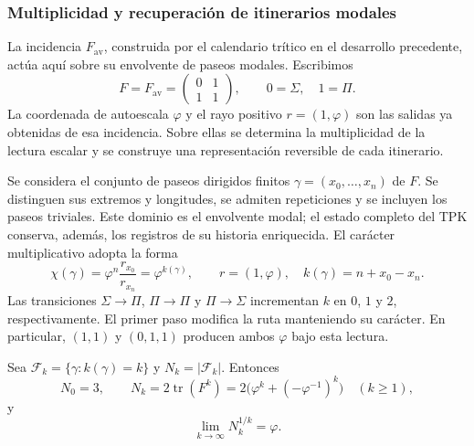 \subsubsection{Multiplicidad y recuperación de itinerarios modales}
\label{corpus9:modal:multiplicidad}

La incidencia \(F_{\mathrm{av}}\), construida por el calendario trítico
en el desarrollo precedente, actúa aquí sobre su envolvente de paseos
modales. Escribimos
\[
 F=F_{\mathrm{av}}=\begin{pmatrix}0&1\\1&1\end{pmatrix},
 \qquad 0=\Sigma,\quad 1=\Pi.
\]
La coordenada de autoescala \(\varphi\) y el rayo positivo
\(r=(1,\varphi)\) son las salidas ya obtenidas de esa incidencia.
Sobre ellas se determina la multiplicidad de la lectura escalar y
se construye una representación reversible de cada itinerario.

Se considera el conjunto de paseos dirigidos finitos
\(\gamma=(x_0,\ldots,x_n)\) de \(F\). Se distinguen sus extremos
y longitudes, se admiten repeticiones y se incluyen los paseos triviales.
Este dominio es el envolvente modal; el estado completo del TPK
conserva, además, los registros de su historia enriquecida.
El carácter multiplicativo adopta la forma
\begin{equation}
 \chi(\gamma)=\varphi^n\frac{r_{x_0}}{r_{x_n}}
             =\varphi^{k(\gamma)},\qquad
 r=(1,\varphi),\quad k(\gamma)=n+x_0-x_n.
 \label{corpus9:modal:caracter}
\end{equation}
Las transiciones \(\Sigma\to\Pi\), \(\Pi\to\Pi\) y
\(\Pi\to\Sigma\) incrementan \(k\) en \(0\), \(1\) y \(2\),
respectivamente. El primer paso modifica la ruta manteniendo su
carácter. En particular, \((1,1)\) y \((0,1,1)\) producen ambos
\(\varphi\) bajo esta lectura.

\begin{proposition}
\label{corpus9:modal:conteo}
Sea \(\mathcal F_k=\{\gamma:k(\gamma)=k\}\) y
\(N_k=|\mathcal F_k|\). Entonces
\begin{equation}
 N_0=3,\qquad
 N_k=2\operatorname{tr}(F^k)
     =2\bigl(\varphi^k+(-\varphi^{-1})^k\bigr)
     \quad(k\geq1),
 \label{corpus9:modal:multiplicidad-exacta}
\end{equation}
y
\[
 \lim_{k\to\infty}N_k^{1/k}=\varphi.
\]
\end{proposition}

